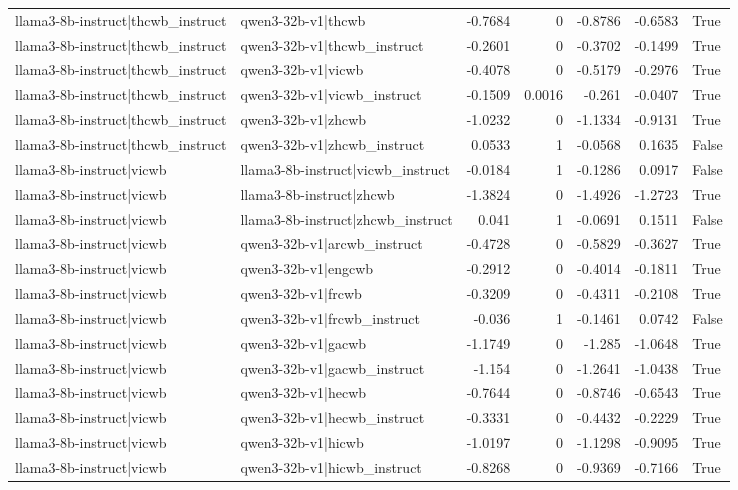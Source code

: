 \begin{table}
\begin{tabular}{l l r r r r l}
llama3-8b-instruct|thcwb_instruct & qwen3-32b-v1|thcwb & -0.7684 & 0 & -0.8786 & -0.6583 & True \\
llama3-8b-instruct|thcwb_instruct & qwen3-32b-v1|thcwb_instruct & -0.2601 & 0 & -0.3702 & -0.1499 & True \\
llama3-8b-instruct|thcwb_instruct & qwen3-32b-v1|vicwb & -0.4078 & 0 & -0.5179 & -0.2976 & True \\
llama3-8b-instruct|thcwb_instruct & qwen3-32b-v1|vicwb_instruct & -0.1509 & 0.0016 & -0.261 & -0.0407 & True \\
llama3-8b-instruct|thcwb_instruct & qwen3-32b-v1|zhcwb & -1.0232 & 0 & -1.1334 & -0.9131 & True \\
llama3-8b-instruct|thcwb_instruct & qwen3-32b-v1|zhcwb_instruct & 0.0533 & 1 & -0.0568 & 0.1635 & False \\
llama3-8b-instruct|vicwb & llama3-8b-instruct|vicwb_instruct & -0.0184 & 1 & -0.1286 & 0.0917 & False \\
llama3-8b-instruct|vicwb & llama3-8b-instruct|zhcwb & -1.3824 & 0 & -1.4926 & -1.2723 & True \\
llama3-8b-instruct|vicwb & llama3-8b-instruct|zhcwb_instruct & 0.041 & 1 & -0.0691 & 0.1511 & False \\
llama3-8b-instruct|vicwb & qwen3-32b-v1|arcwb_instruct & -0.4728 & 0 & -0.5829 & -0.3627 & True \\
llama3-8b-instruct|vicwb & qwen3-32b-v1|engcwb & -0.2912 & 0 & -0.4014 & -0.1811 & True \\
llama3-8b-instruct|vicwb & qwen3-32b-v1|frcwb & -0.3209 & 0 & -0.4311 & -0.2108 & True \\
llama3-8b-instruct|vicwb & qwen3-32b-v1|frcwb_instruct & -0.036 & 1 & -0.1461 & 0.0742 & False \\
llama3-8b-instruct|vicwb & qwen3-32b-v1|gacwb & -1.1749 & 0 & -1.285 & -1.0648 & True \\
llama3-8b-instruct|vicwb & qwen3-32b-v1|gacwb_instruct & -1.154 & 0 & -1.2641 & -1.0438 & True \\
llama3-8b-instruct|vicwb & qwen3-32b-v1|hecwb & -0.7644 & 0 & -0.8746 & -0.6543 & True \\
llama3-8b-instruct|vicwb & qwen3-32b-v1|hecwb_instruct & -0.3331 & 0 & -0.4432 & -0.2229 & True \\
llama3-8b-instruct|vicwb & qwen3-32b-v1|hicwb & -1.0197 & 0 & -1.1298 & -0.9095 & True \\
llama3-8b-instruct|vicwb & qwen3-32b-v1|hicwb_instruct & -0.8268 & 0 & -0.9369 & -0.7166 & True \\

\end{tabular}
\end{table}
